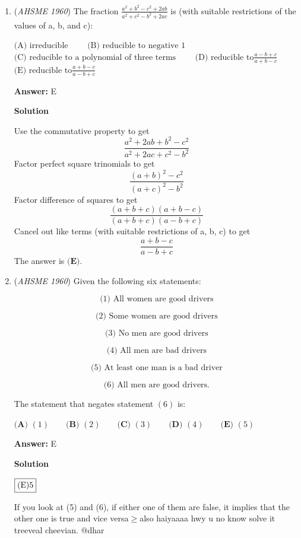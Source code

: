 \begin{enumerate}
 The sum of the numerator and the denominator is $349$, so the answer is $\boxed{\textbf{(D)}}$ .

 


	\item (\textit{AHSME 1960}) The fraction $\frac{a^2+b^2-c^2+2ab}{a^2+c^2-b^2+2ac}$ is (with suitable restrictions of the values of a, b, and c):


 $\text{(A) irreducible}\qquad$
$\text{(B) reducible to negative 1}\qquad$
$\text{(C) reducible to a polynomial of three terms}\qquad$
$\text{(D) reducible to} \frac{a-b+c}{a+b-c}\qquad$
$\text{(E) reducible to} \frac{a+b-c}{a-b+c}$

 \textbf{Answer: }E



\textbf{Solution}

Use the commutative property to get
 \[\frac{a^2+2ab+b^2-c^2}{a^2+2ac+c^2-b^2}\]Factor perfect square trinomials to get
 \[\frac{(a+b)^2-c^2}{(a+c)^2-b^2}\]Factor difference of squares to get
 \[\frac{(a+b+c)(a+b-c)}{(a+b+c)(a-b+c)}\]Cancel out like terms (with suitable restrictions of a, b, c) to get
 \[\frac{a+b-c}{a-b+c}\]The answer is $\boxed{\textbf{(E)}}$.

 


	\item (\textit{AHSME 1960}) Given the following six statements:

 \[\text{(1) All women are good drivers}\]

 \[\text{(2) Some women are good drivers}\]

 \[\text{(3) No men are good drivers}\]

 \[\text{(4) All men are bad drivers}\]

 \[\text{(5) At least one man is a bad driver}\]

 \[\text{(6) All men are good drivers.}\]


 

The statement that negates statement $(6)$ is:


 

$\textbf{(A) }(1)\qquad \textbf{(B) }(2)\qquad \textbf{(C) }(3)\qquad \textbf{(D) }(4)\qquad \textbf{(E) }(5)$

 \textbf{Answer: }E



\textbf{Solution}

$\fbox{(E)5}$

 If you look at (5) and (6), if either one of them are false, it implies that the other one is true and vice versa$\geq$also haiyaaaa hwy u no know solve it treeveal cheevian. @dhar


\end{enumerate}
